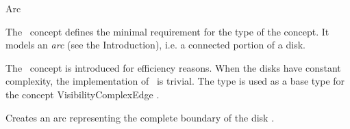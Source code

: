 
\ccRefPageBegin


\begin{ccRefConcept}{Arc}
\label{pageVCArcRef}
  
\ccDefinition

The \ccRefName\ concept defines the minimal requirement for the
 type of the  concept. It
models an \emph{arc} (see the Introduction), i.e. a connected portion of a disk.

The \ccRefName\ concept is introduced for efficiency reasons. When the disks
have constant complexity, the implementation of \ccRefName\ is trivial. The
 type is used as a base type for the concept VisibilityComplexEdge
.
  
\ccTypes
{}
\ccThreeToTwo

\ccGlue
{}
\ccGlue
{}
\ccGlue
{}

\ccThreeToTwo
\ccCreation
{}

\ccGlue
{}
{ Creates an arc representing the complete boundary of the disk . }


\end{ccRefConcept}
